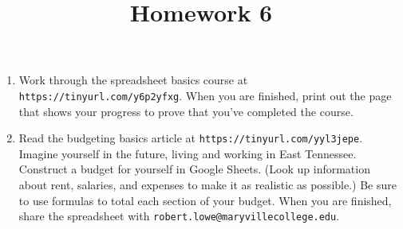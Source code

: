 \documentclass{article}
\title{Homework 6}
\begin{document}
\maketitle

\begin{enumerate}
\item Work through the spreadsheet basics course at {\tt https://tinyurl.com/y6p2yfxg}.
When you are finished, print out the page that shows your progress to prove that you've completed the course.

\item Read the budgeting basics article at {\tt https://tinyurl.com/yyl3jepe}.  
Imagine yourself in the future, living and working in East Tennessee.  Construct a budget
for yourself in Google Sheets.  (Look up information about rent, salaries, and expenses to make it as realistic as possible.)  Be sure to use formulas to total each section of your 
budget.  When you are finished, share the spreadsheet with {\tt robert.lowe@maryvillecollege.edu}.

\end{enumerate}
\end{document}
